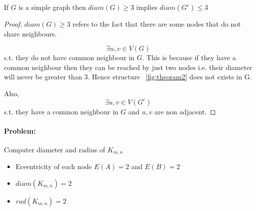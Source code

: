 \begin{theorem} If $G$ is a simple graph then $diam(G) \geq 3$ implies $diam(G^c) \leq 3$
\end{theorem}
\begin{proof}
$diam(G) \geq 3$ refers to the fact that there are some nodes that do not share neighbours.

\begin{equation}
    {\textstyle \exists u,v \in V(G)}
 \end{equation}  s.t. they do not have common neighbour in $G$. This is because if they have a common neighbour then they can be reached by just two nodes i.e. their diameter will never be greater than 3. Hence structure ~\ref{fig:theoram2} does not exists in G.

Also,
\begin{equation}
    {\textstyle \exists u,v \in V(G^c)}
\end{equation} s.t. they have a common neighbour in $G$ and $u,v$ are non adjacent.
\end{proof}


\paragraph{Problem:}Computer diameter and radius of $K_{m,n}$ \begin{itemize}
    \item Eceentricity of each node $E(A) = 2$ and $E(B) = 2$ 
    \item $diam(K_{m,n}) = 2 $
    \item $rad(K_{m,n}) = 2 $
\end{itemize}


